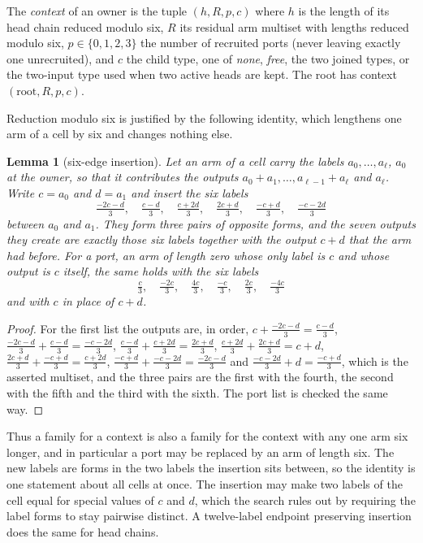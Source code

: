 \documentclass[11pt,a4paper]{article}
\theoremstyle{plain}
\newtheorem{lemma}[theorem]{Lemma}
\theoremstyle{definition}
\theoremstyle{remark}
\begin{document}
The \emph{context} of an owner is the tuple $(h,R,p,c)$ where $h$ is the
length of its head chain reduced modulo six, $R$ its residual arm multiset
with lengths reduced modulo six, $p\in\{0,1,2,3\}$ the number of recruited
ports (never leaving exactly one unrecruited), and $c$ the child type, one of
\emph{none}, \emph{free}, the two joined types, or the two-input type used
when two active heads are kept.  The root has context $(\mathrm{root},R,p,c)$.

Reduction modulo six is justified by the following identity, which lengthens
one arm of a cell by six and changes nothing else.

\begin{lemma}[six-edge insertion]\label{lem:insertion}
Let an arm of a cell carry the labels $a_0,\dots,a_\ell$, $a_0$ at the owner,
so that it contributes the outputs $a_0+a_1,\dots,a_{\ell-1}+a_\ell$ and
$a_\ell$.  Write $c=a_0$ and $d=a_1$ and insert the six labels
\[
  \tfrac{-2c-d}{3},\quad \tfrac{c-d}{3},\quad \tfrac{c+2d}{3},\quad
  \tfrac{2c+d}{3},\quad \tfrac{-c+d}{3},\quad \tfrac{-c-2d}{3}
\]
between $a_0$ and $a_1$.  They form three pairs of opposite forms, and the
seven outputs they create are exactly those six labels together with the
output $c+d$ that the arm had before.  For a port, an arm of length zero whose
only label is $c$ and whose output is $c$ itself, the same holds with the six
labels
\[
  \tfrac{c}{3},\quad \tfrac{-2c}{3},\quad \tfrac{4c}{3},\quad
  \tfrac{-c}{3},\quad \tfrac{2c}{3},\quad \tfrac{-4c}{3}
\]
and with $c$ in place of $c+d$.
\end{lemma}

\begin{proof}
For the first list the outputs are, in order,
$c+\frac{-2c-d}{3}=\frac{c-d}{3}$, $\frac{-2c-d}{3}+\frac{c-d}{3}=\frac{-c-2d}{3}$,
$\frac{c-d}{3}+\frac{c+2d}{3}=\frac{2c+d}{3}$,
$\frac{c+2d}{3}+\frac{2c+d}{3}=c+d$,
$\frac{2c+d}{3}+\frac{-c+d}{3}=\frac{c+2d}{3}$,
$\frac{-c+d}{3}+\frac{-c-2d}{3}=\frac{-2c-d}{3}$ and
$\frac{-c-2d}{3}+d=\frac{-c+d}{3}$, which is the asserted multiset, and the
three pairs are the first with the fourth, the second with the fifth and the
third with the sixth.  The port list is checked the same way.
\end{proof}

Thus a family for a context is also a family for the context with any one
arm six longer, and in particular a port may be replaced by an arm of length
six.  The new labels are forms in the two labels the insertion sits between,
so the identity is one statement about all cells at once.  The
insertion may make two labels of the cell equal for special values of $c$ and
$d$, which the search rules out by requiring the label forms to stay pairwise
distinct.  A twelve-label endpoint preserving insertion does the same for head
chains.
\end{document}

